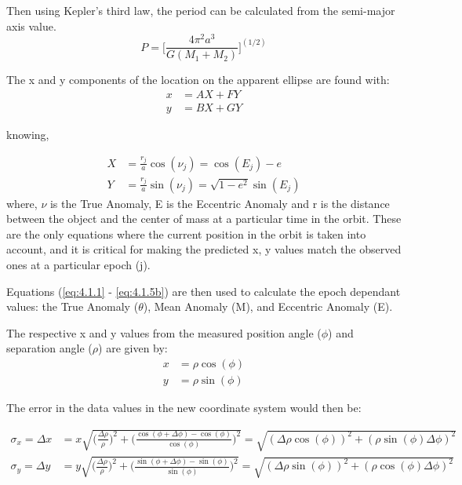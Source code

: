 \documentclass[12pt,preprint]{aastex}
\begin{document}
Then using Kepler's third law, the period can be calculated from the semi-major axis value.
\begin{equation}\label{eq:28}
P = \bigg[\frac{4\pi^2a^3}{G(M_1+M_2)} \bigg]^{(1/2)}
\end{equation}

The x and y components of the location on the apparent ellipse are found with:
\begin{subequations}
\begin{align}\label{eq:28-1a}
x& = AX+FY\\
\label{eq:28-1b}
y& = BX + GY
\end{align}
\end{subequations}

knowing,

\begin{subequations}
\begin{align}\label{eq:28-1.5a}
X& = \frac{r_j}{a}\cos(\nu_j) = \cos(E_j)-e\\
\label{eq:28-1.5b}
Y& = \frac{r_j}{a}\sin(\nu_j) = \sqrt{1-e^2}\sin(E_j) 
\end{align}
\end{subequations}
where, $\nu$ is the True Anomaly, E is the Eccentric Anomaly and r is the distance between the object and the center of mass at a particular time in the orbit.  These are the only equations where the current position in the orbit is taken into account, and it is critical for making the predicted x, y values match the observed ones at a particular epoch (j).

Equations (\ref{eq:4.1.1} - \ref{eq:4.1.5b}) are then used to calculate the epoch dependant values: the True Anomaly ($\theta$), Mean Anomaly (M), and Eccentric Anomaly (E).

The respective x and y values from the measured position angle ($\phi$) and separation angle ($\rho$) are given by:
\begin{subequations}
\begin{align}\label{eq:28-2a}
x& = \rho \cos(\phi)\\
\label{eq:28-2b}
y& = \rho \sin(\phi)
\end{align}
\end{subequations}

The error in the data values in the new coordinate system would then be:

\begin{subequations}
\begin{align}\label{eq:28-3a}
\sigma_{x}=\Delta x& = x \sqrt{\bigg(\frac{\Delta\rho}{\rho}\bigg)^2 +\bigg(\frac{\cos(\phi+\Delta\phi)-\cos(\phi)}{\cos(\phi)}\bigg)^2} = \sqrt{(\Delta \rho \cos(\phi))^2+(\rho \sin(\phi)\Delta \phi)^2}\\
\label{eq:28-3b}
\sigma_{y}=\Delta y& = y \sqrt{\bigg(\frac{\Delta\rho}{\rho}\bigg)^2 +\bigg(\frac{\sin(\phi+\Delta\phi)-\sin(\phi)}{\sin(\phi)}\bigg)^2} = \sqrt{(\Delta \rho \sin(\phi))^2+(\rho \cos(\phi)\Delta \phi)^2}
\end{align}
\end{subequations}
 
\end{document}
